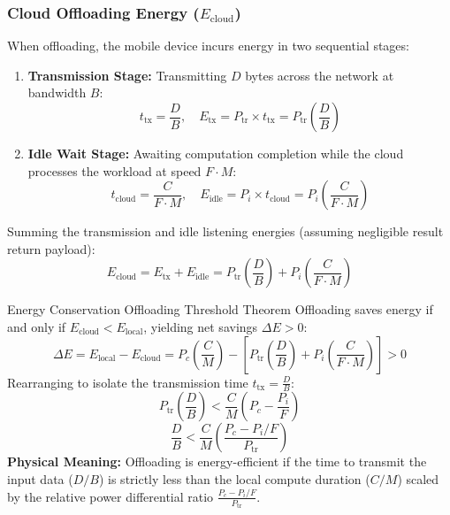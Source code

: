 \subsubsection{Cloud Offloading Energy ($E_{\text{cloud}}$)}
When offloading, the mobile device incurs energy in two sequential stages:
\begin{enumerate}[leftmargin=*]
  \item \textbf{Transmission Stage:} Transmitting $D$ bytes across the network at bandwidth $B$:
  \begin{equation}
  t_{\text{tx}} = \frac{D}{B}, \quad E_{\text{tx}} = P_{\text{tr}} \times t_{\text{tx}} = P_{\text{tr}} \left( \frac{D}{B} \right)
  \end{equation}
  \item \textbf{Idle Wait Stage:} Awaiting computation completion while the cloud processes the workload at speed $F \cdot M$:
  \begin{equation}
  t_{\text{cloud}} = \frac{C}{F \cdot M}, \quad E_{\text{idle}} = P_i \times t_{\text{cloud}} = P_i \left( \frac{C}{F \cdot M} \right)
  \end{equation}
\end{enumerate}
Summing the transmission and idle listening energies (assuming negligible result return payload):
\begin{equation}
E_{\text{cloud}} = E_{\text{tx}} + E_{\text{idle}} = P_{\text{tr}} \left( \frac{D}{B} \right) + P_i \left( \frac{C}{F \cdot M} \right)
\end{equation}

\begin{thmbox}{Energy Conservation Offloading Threshold Theorem}
Offloading saves energy if and only if $E_{\text{cloud}} < E_{\text{local}}$, yielding net savings $\Delta E > 0$:
\begin{equation}
\Delta E = E_{\text{local}} - E_{\text{cloud}} = P_c \left( \frac{C}{M} \right) - \left[ P_{\text{tr}} \left( \frac{D}{B} \right) + P_i \left( \frac{C}{F \cdot M} \right) \right] > 0
\end{equation}
Rearranging to isolate the transmission time $t_{\text{tx}} = \frac{D}{B}$:
\begin{equation}
P_{\text{tr}} \left( \frac{D}{B} \right) < \frac{C}{M} \left( P_c - \frac{P_i}{F} \right)
\end{equation}
\begin{equation}
\frac{D}{B} < \frac{C}{M} \left( \frac{P_c - P_i / F}{P_{\text{tr}}} \right)
\end{equation}
\textbf{Physical Meaning:} Offloading is energy-efficient if the time to transmit the input data ($D/B$) is strictly less than the local compute duration ($C/M$) scaled by the relative power differential ratio $\frac{P_c - P_i/F}{P_{\text{tr}}}$.
\end{thmbox}

